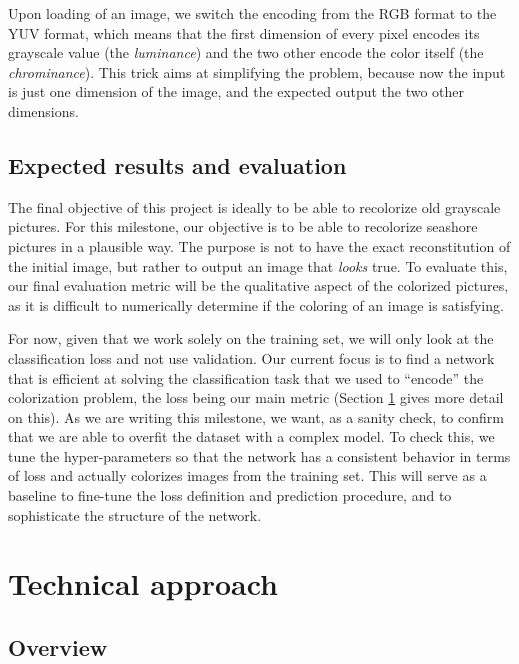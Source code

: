 \documentclass[10pt,twocolumn,letterpaper]{article}
\begin{document}
Upon loading of an image, we switch the encoding from the RGB format to the YUV format, which means that the first dimension of every pixel encodes its grayscale value (the \textit{luminance}) and the two other encode the color itself (the \textit{chrominance}). This trick aims at simplifying the problem, because now the input is just one dimension of the image, and the expected output the two other dimensions.

\subsection{Expected results and evaluation}


The final objective of this project is ideally to be able to recolorize old grayscale pictures. For this milestone, our objective is to be able to recolorize seashore pictures in a plausible way. The purpose is not to have the exact reconstitution of the initial image, but rather to output an image that \textit{looks} true. To evaluate this, our final evaluation metric will be the qualitative aspect of the colorized pictures, as it is difficult to numerically determine if the coloring of an image is satisfying.

For now, given that we work solely on the training set, we will only look at the classification loss and not use validation. Our current focus is to find a network that is efficient at solving the classification task that we used to ``encode'' the colorization problem, the loss being our main metric (Section \ref{overview} gives more detail on this). As we are writing this milestone, we want, as a sanity check, to confirm that we are able to overfit the dataset with a complex model. To check this, we tune the hyper-parameters so that the network has a consistent behavior in terms of loss and actually colorizes images from the training set.
This will serve as a baseline to fine-tune the loss definition and prediction procedure, and to sophisticate the structure of the network.

\section{Technical approach} \label{overview}

\subsection{Overview}
\end{document}
